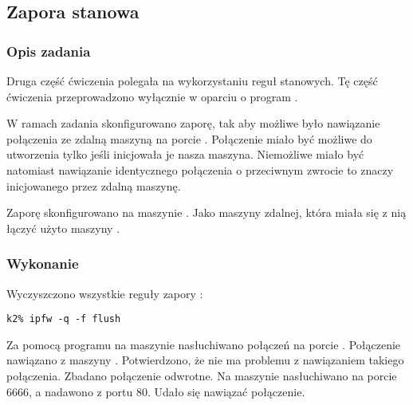 \subsection{Zapora stanowa}
\label{sec:stanowe}


\subsubsection{Opis zadania}

Druga część ćwiczenia polegała na wykorzystaniu reguł stanowych. Tę część
ćwiczenia przeprowadzono wyłącznie w oparciu o program \ipfw{}.

W ramach zadania skonfigurowano zaporę, tak aby możliwe było nawiązanie
połączenia ze zdalną maszyną na porcie \pos. Połączenie miało być możliwe do
utworzenia tylko jeśli inicjowała je nasza maszyna. Niemożliwe miało być
natomiast nawiązanie identycznego połączenia o przeciwnym zwrocie to znaczy
inicjowanego przez zdalną maszynę.

Zaporę skonfigurowano na maszynie \kdwa{}. Jako maszyny zdalnej, która miała
się z nią łączyć użyto maszyny \kpiec{}.







\subsubsection{Wykonanie}

Wyczyszczono wszystkie reguły zapory \ipfw:

\begin{lstlisting}
k2% ipfw -q -f flush
\end{lstlisting}

Za pomocą programu \nc{} na maszynie \kpiec{} nasłuchiwano połączeń na porcie
\pos. Połączenie nawiązano z maszyny \kdwa{}. Potwierdzono, że nie ma problemu z
nawiązaniem takiego połączenia. Zbadano połączenie odwrotne. Na maszynie \kdwa{}
nasłuchiwano na porcie 6666, a nadawono z portu 80. Udało się nawiązać
połączenie.

